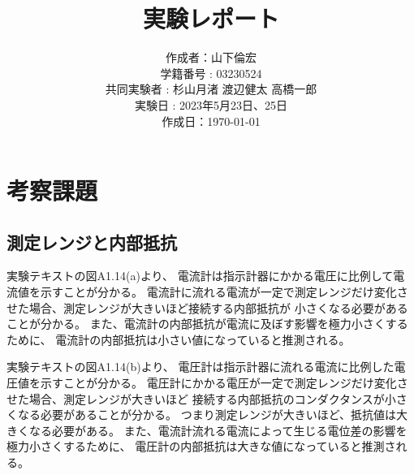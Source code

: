 \documentclass[11pt,a4paper]{ltjsarticle}
\title{実験レポート}
\date{}
\author{作成者：山下倫宏
\\ 学籍番号 : 03230524
\\ 共同実験者 : 杉山月渚 渡辺健太 高橋一郎
\\ 実験日 : 2023年5月23日、25日
\\ 作成日：\today}
\begin{document}
\maketitle

\section{考察課題}
\subsection{測定レンジと内部抵抗}
実験テキスト\cite{text}の図A1.14(a)より、
電流計は指示計器にかかる電圧に比例して電流値を示すことが分かる。
電流計に流れる電流が一定で測定レンジだけ変化させた場合、測定レンジが大きいほど接続する内部抵抗が
小さくなる必要があることが分かる。
また、電流計の内部抵抗が電流に及ぼす影響を極力小さくするために、
電流計の内部抵抗は小さい値になっていると推測される。

実験テキスト\cite{text}の図A1.14(b)より、
電圧計は指示計器に流れる電流に比例した電圧値を示すことが分かる。
電圧計にかかる電圧が一定で測定レンジだけ変化させた場合、測定レンジが大きいほど
接続する内部抵抗のコンダクタンスが小さくなる必要があることが分かる。
つまり測定レンジが大きいほど、抵抗値は大きくなる必要がある。
また、電流計流れる電流によって生じる電位差の影響を極力小さくするために、
電圧計の内部抵抗は大きな値になっていると推測される。
\end{document}
